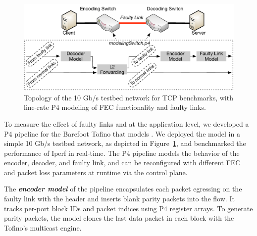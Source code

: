 



\begin{figure}
  \centering
  \includegraphics[width=0.4\paperwidth]{figures/lineRateModel.pdf}
  \caption{\label{fig:p4ModelTopo} Topology of the 10 Gb/s testbed 
  network for TCP benchmarks, with line-rate P4 modeling of FEC functionality and faulty links.}
\end{figure}

To measure the effect of faulty links and \OurSys at the application level, we
developed a P4 pipeline for the Barefoot Tofino that models \OurSys. We
deployed the model in a simple 10 Gb/s testbed network, as depicted in
Figure~\ref{fig:p4ModelTopo}, and benchmarked the performance of 
Iperf in real-time. The P4 pipeline models the behavior of the encoder, 
decoder, and faulty link, and can be reconfigured with different FEC and 
packet loss parameters at runtime via the control plane. 

The \textbf{\em encoder model} of the pipeline encapsulates each packet egressing on
the faulty link with the \OurSys header and inserts blank  parity packets into
the flow. It tracks per-port block IDs and  packet indices using P4 register
arrays. To generate parity packets, the  model clones the last data packet in
each block with the Tofino's multicast engine.

